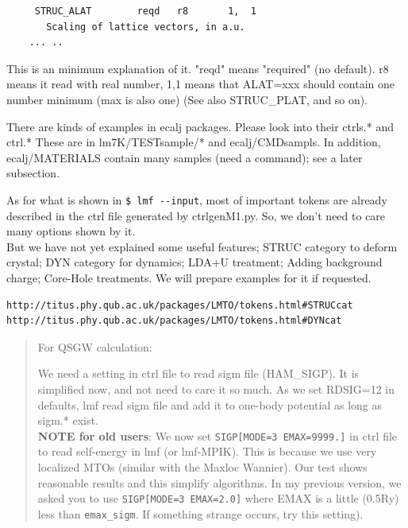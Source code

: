 {\begin{verbatim}
     STRUC_ALAT        reqd   r8       1,  1
       Scaling of lattice vectors, in a.u.
    ... ..
\end{verbatim}
This is an minimum explanation of it. "reqd" means "required" (no
default). r8 means it read with real number, 1,1 means
that ALAT=xxx should contain one number minimum (max is also one)
(See also STRUC\_PLAT, and so on).

There are kinds of examples in ecalj packages.
Please look into their ctrls.* and ctrl.*
These are in lm7K/TESTsample/* and ecalj/CMDsampls. 
In addition, ecalj/MATERIALS contain many samples
(need a command); see a later subsection.

As for what is shown in \verb+$ lmf --input+, most of important tokens are
already described in the ctrl file generated by ctrlgenM1.py.
So, we don't need to care many options shown by it.\\

But we have not yet explained some useful features;
STRUC category to deform crystal; DYN category for dynamics; LDA+U
treatment; Adding background charge; Core-Hole treatments.
We will prepare examples for it if requested.
\begin{verbatim}
http://titus.phy.qub.ac.uk/packages/LMTO/tokens.html#STRUCcat
http://titus.phy.qub.ac.uk/packages/LMTO/tokens.html#DYNcat
\end{verbatim}


\begin{quote}
For QSGW calculation:

We need a setting in ctrl file to read sigm file (HAM\_SIGP). 
It is simplified now, and not need to care it so much.
As we set RDSIG=12 in defaults, lmf read sigm file and add it to one-body
potential as long as sigm.* exist.\\

{\bf NOTE for old users}: We now set \verb+SIGP[MODE=3 EMAX=9999.]+
in ctrl file to read self-energy in lmf (or lmf-MPIK). 
This is because we use very localized MTOs (similar with the Maxloc Wannier).
Our test shows reasonable results and this simplify algorithms.
In my previous version, we asked you to use \verb+SIGP[MODE=3 EMAX=2.0]+
where EMAX is a little (0.5Ry) less than \verb+emax_sigm+. If something
strange occurs, try this setting).


\end{quote}}
